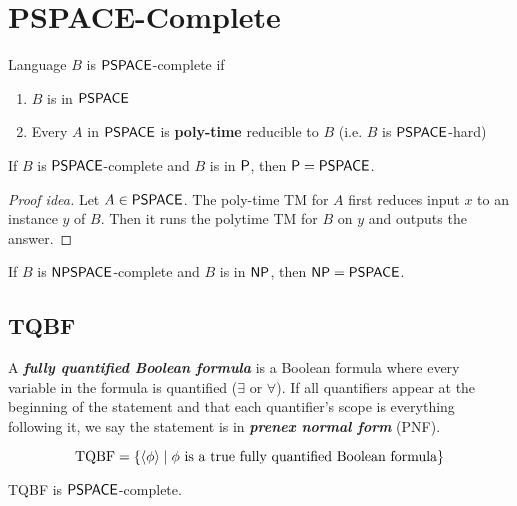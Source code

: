 \section{PSPACE-Complete}

\begin{definition}
    Language $B$ is $\mathsf{PSPACE}$-complete if
    \begin{enumerate}
        \item $B$ is in $\mathsf{PSPACE}$
        \item Every $A$ in $\mathsf{PSPACE}$ is \textbf{poly-time} reducible to $B$ (i.e. $B$ is $\mathsf{PSPACE}$-hard)
    \end{enumerate}
\end{definition}

\begin{theorem}
    If $B$ is $\mathsf{PSPACE}$-complete and $B$ is in $\mathsf{P}$, then $\mathsf{P} = \mathsf{PSPACE}$.
\end{theorem}

\begin{proof}[Proof idea]
    Let $A \in \mathsf{PSPACE}$. The poly-time TM for $A$ first reduces input $x$ to an instance $y$ of $B$. Then it runs the polytime TM for $B$ on $y$ and outputs the answer.
\end{proof}

\begin{theorem}
    If $B$ is $\mathsf{NPSPACE}$-complete and $B$ is in $\mathsf{NP}$, then $\mathsf{NP} = \mathsf{PSPACE}$.
\end{theorem}

\subsection{TQBF}

\vspace{\parskip}

\begin{definition}
    A \textit{\textbf{fully quantified Boolean formula}} is a Boolean formula where every variable in the formula is quantified ($\exists$ or $\forall$). If all quantifiers appear at the beginning of the statement and that each quantifier's scope is everything following it, we say the statement is in \textit{\textbf{prenex normal form}} (PNF).
\end{definition}

$$
\text{TQBF} = \{\langle \phi \rangle \mid \text{$\phi$ is a true fully quantified Boolean formula}\}
$$

\begin{theorem}
    TQBF is $\mathsf{PSPACE}$-complete.
\end{theorem}

